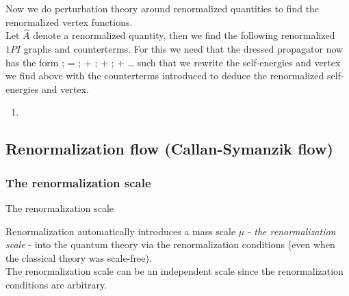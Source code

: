 Now we do perturbation theory around renormalized quantities to find the renormalized vertex functions.\\
Let $\hat{A}$ denote a renormalized quantity, then we find the following renormalized $1PI$ graphs and counterterms.
For this we need that the dressed propagator now has the form 
\bse 
{}; = ; + ; + ; + \dots 
\ese 
such that we rewrite the self-energies and vertex we find above with the counterterms introduced to deduce the renormalized self-energies and vertex.
\begin{enumerate}
	\item 
\end{enumerate}












 


\subsection{Renormalization flow (Callan-Symanzik flow)}
\subsubsection{The renormalization scale}
\begin{mybox}{The renormalization scale}
	
	Renormalization automatically introduces a mass scale $\mu$ - \emph{the renormalization scale} - into the quantum theory via the renormalization conditions (even when the classical theory was scale-free).\\
	The renormalization scale can be an independent scale since the renormalization conditions are arbitrary.
\end{mybox}
